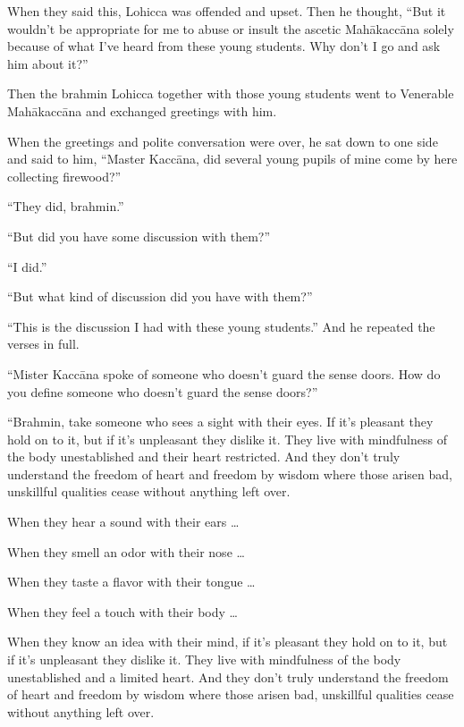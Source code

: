 \documentclass[12pt,openany]{book}%
\begin{document}
When they said this, Lohicca was offended and upset. Then he thought, “But it wouldn’t be appropriate for me to abuse or insult the ascetic \textsanskrit{Mahākaccāna} solely because of what I’ve heard from these young students. Why don’t I go and ask him about it?” 

Then the brahmin Lohicca together with those young students went to Venerable \textsanskrit{Mahākaccāna} and exchanged greetings with him. 

When the greetings and polite conversation were over, he sat down to one side and said to him, “Master \textsanskrit{Kaccāna}, did several young pupils of mine come by here collecting firewood?” 

“They did, brahmin.” 

“But did you have some discussion with them?” 

“I did.” 

“But what kind of discussion did you have with them?” 

“This is the discussion I had with these young students.” And he repeated the verses in full. 

“Mister \textsanskrit{Kaccāna} spoke of someone who doesn’t guard the sense doors. How do you define someone who doesn’t guard the sense doors?” 

“Brahmin, take someone who sees a sight with their eyes. If it’s pleasant they hold on to it, but if it’s unpleasant they dislike it. They live with mindfulness of the body unestablished and their heart restricted. And they don’t truly understand the freedom of heart and freedom by wisdom where those arisen bad, unskillful qualities cease without anything left over. 

When they hear a sound with their ears … 

When they smell an odor with their nose … 

When they taste a flavor with their tongue … 

When they feel a touch with their body … 

When they know an idea with their mind, if it’s pleasant they hold on to it, but if it’s unpleasant they dislike it. They live with mindfulness of the body unestablished and a limited heart. And they don’t truly understand the freedom of heart and freedom by wisdom where those arisen bad, unskillful qualities cease without anything left over. 
\end{document}
